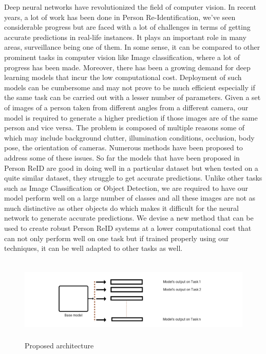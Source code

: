 \documentclass[10pt,twocolumn,letterpaper]{article}
\begin{document}
Deep neural networks have revolutionized the field of computer vision. In recent years, a lot of work has been done in Person Re-Identification, we've seen considerable progress but are faced with a lot of challenges in terms of getting accurate predictions in real-life instances. It plays an important role in many areas, surveillance being one of them. In some sense, it can be compared to other prominent tasks in computer vision like Image classification, where a lot of progress has been made. Moreover, there has been a growing demand for deep learning models that incur the low computational cost. Deployment of such models can be cumbersome and may not prove to be much efficient especially if the same task can be carried out with a lesser number of parameters. Given a set of images of a person taken from different angles from a different camera, our model is required to generate a higher prediction if those images are of the same person and vice versa. The problem is composed of multiple reasons some of which may include background clutter, illumination conditions, occlusion, body pose, the orientation of cameras. Numerous methods have been proposed to address some of these issues. So far the models that have been proposed in Person ReID are good in doing well in a particular dataset but when tested on a quite similar dataset, they struggle to get accurate predictions. Unlike other tasks such as Image Classification or Object Detection, we are required to have our model perform well on a large number of classes and all these images are not as much distinctive as other objects do which makes it difficult for the neural network to generate accurate predictions. We devise a new method that can be used to create robust Person ReID systems at a lower computational cost that can not only perform well on one task but if trained properly using our techniques, it can be well adapted to other tasks as well.



\begin{figure}
\includegraphics[width=\textwidth,height=4cm]{arch2.png}
\caption{Proposed architecture}
\end{figure}
\end{document}
